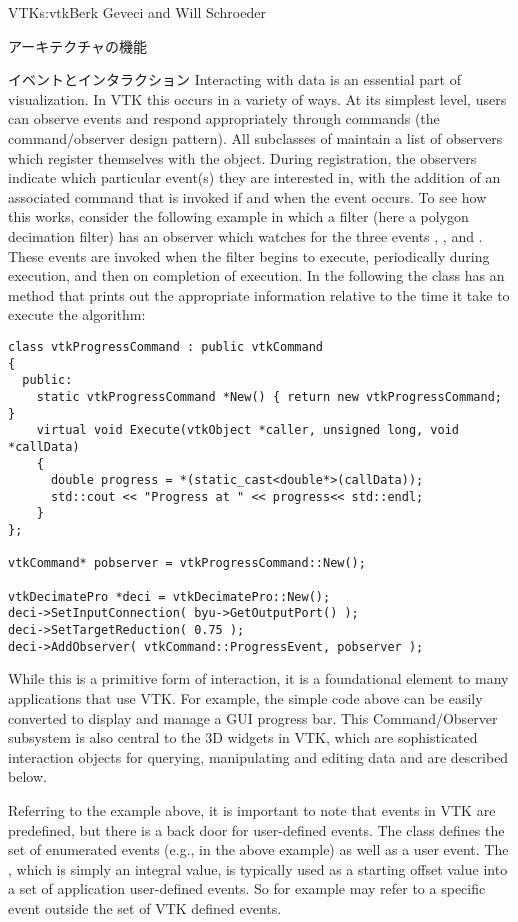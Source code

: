 \begin{aosachapter}{VTK}{s:vtk}{Berk Geveci and Will Schroeder}
\begin{aosasect1}{アーキテクチャの機能}
\begin{aosasect2}{イベントとインタラクション}
Interacting with data is an essential part of visualization. In VTK
this occurs in a variety of ways. At its simplest level, users can
observe events and respond appropriately through commands (the
command/observer design pattern). All subclasses of 
maintain a list of observers which register themselves with the
object. During registration, the observers indicate which particular
event(s) they are interested in, with the addition of an associated
command that is invoked if and when the event occurs. To see how this
works, consider the following example in which a filter (here a
polygon decimation filter) has an observer which watches for the three
events , , and
. These events are invoked when the filter begins to
execute, periodically during execution, and then on completion of
execution. In the following the  class has an
 method that prints out the appropriate information
relative to the time it take to execute the algorithm:

\begin{verbatim}
class vtkProgressCommand : public vtkCommand
{
  public:
    static vtkProgressCommand *New() { return new vtkProgressCommand; }
    virtual void Execute(vtkObject *caller, unsigned long, void *callData)
    {
      double progress = *(static_cast<double*>(callData));
      std::cout << "Progress at " << progress<< std::endl;
    }
};

vtkCommand* pobserver = vtkProgressCommand::New();

vtkDecimatePro *deci = vtkDecimatePro::New();
deci->SetInputConnection( byu->GetOutputPort() );
deci->SetTargetReduction( 0.75 );
deci->AddObserver( vtkCommand::ProgressEvent, pobserver );
\end{verbatim}

While this is a primitive form of interaction, it is a foundational
element to many applications that use VTK\@. For example, the simple
code above can be easily converted to display and manage a GUI
progress bar. This Command/Observer subsystem is also central to the
3D widgets in VTK, which are sophisticated interaction objects for
querying, manipulating and editing data and are described below.

Referring to the example above, it is important to note that events in
VTK are predefined, but there is a back door for user-defined
events. The class  defines the set of enumerated
events (e.g.,  in the above example)
as well as a user event. The , which is simply an integral
value, is typically used as a starting offset value into a set of
application user-defined events. So for example
 may refer to a specific event outside
the set of VTK defined events.


\end{aosasect2}
\end{aosasect1}
\end{aosachapter}
